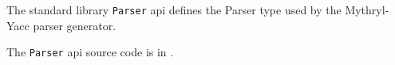 
The standard library {\tt Parser} api defines the Parser type used by the Mythryl-Yacc parser generator.

The {\tt Parser} api source code is in .






